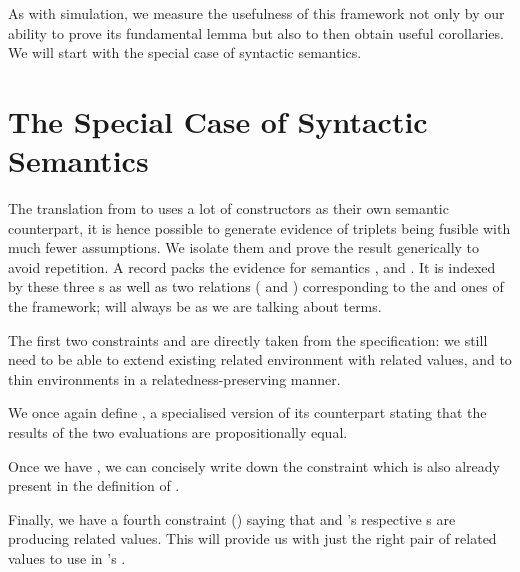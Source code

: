 As with simulation, we measure the usefulness of this framework not only
by our ability to prove its fundamental lemma but also to then obtain
useful corollaries. We will start with the special case of syntactic
semantics.

\section{The Special Case of Syntactic Semantics}
\label{sec:fusion-syntactic}

The translation from  to  uses a lot of constructors
as their own semantic counterpart, it is hence possible to generate evidence of
 triplets being fusible with much fewer assumptions. We isolate
them and prove the result generically to avoid repetition. A 
record packs the evidence for  semantics ,  and
. It is indexed by these three s as well as two relations
( and ) corresponding to the  and  ones of the
 framework;  will always be  as we are talking about terms.


The first two constraints  and  are directly taken
from the  specification: we still need to be able to extend existing related
environment with related values, and to thin environments in a relatedness-preserving manner.


We once again define , a specialised version of its  counterpart
stating that the results of the two evaluations are propositionally equal.


Once we have , we can concisely write down the constraint  which
is also already present in the definition of .


Finally, we have a fourth constraint () saying that  and
's respective s are producing related values. This will provide
us with just the right pair of related values to use in 's .

